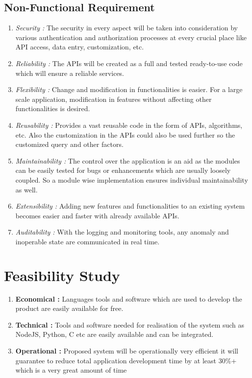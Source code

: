\documentclass[a4paper,12pt]{report}
\begin{document}
    \subsection{Non-Functional Requirement}
    \begin{enumerate}
      \item {\emph {Security :} 
      The security in every aspect will be taken into consideration by various authentication and authorization processes at every crucial place like API access, data entry, customization, etc.      
      }
      \item {\emph {Reliability :} 
      The APIs will be created as a full and tested ready-to-use code which will ensure a reliable services.
      }
      \item {\emph {Flexibility :} 
      Change and modification in functionalities is easier. For a large scale application, modification in features without affecting other functionalities is desired.
      }
      \item {\emph {Reusability :} 
      Provides a vast reusable code in the form of APIs, algorithms, etc. Also the customization in the APIs could also be used further so the customized query and other factors.
      }
      \item {\emph {Maintainability :} 
      The control over the application is an aid as the modules can be easily tested for bugs or enhancements which are usually loosely coupled. So a module wise implementation ensures individual maintainability as well.
      }
      \item {\emph {Extensibility :} 
      Adding new features and functionalities to an existing system becomes easier and faster with already available APIs. 
      }
      \item {\emph {Auditability :} 
      With the logging and monitoring tools, any anomaly and inoperable state are communicated in real time.      
      }
    \end{enumerate}
    \section{Feasibility Study}    
    \begin{enumerate}
      \item {\textbf{Economical :} 
      Languages tools and software which are used to develop the product are easily available for free.
      }
      \item {\textbf{Technical :} 
      Tools and software needed for realisation of the system such as NodeJS, Python, C etc are easily available and can be integrated.
      }
      \item {\textbf{Operational :} 
      Proposed system will be operationally very efficient it will guarantee to reduce total application development time by at least 30{\%}+ which is a very great amount of time 
      }
    \end{enumerate}
\end{document}
